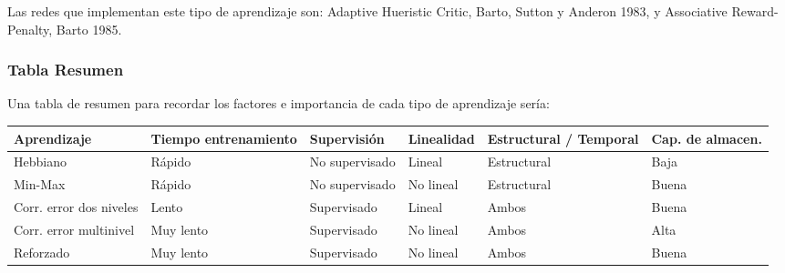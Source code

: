 Las redes que implementan este tipo de aprendizaje son: Adaptive Hueristic
Critic, Barto, Sutton y Anderon 1983, y Associative Reward-Penalty, Barto 1985.

\subsubsection{Tabla Resumen}

Una tabla de resumen para recordar los factores e importancia de cada tipo de aprendizaje sería:

\begin{tabularx}{\textwidth}{|X|X|X|X|X|X|}
	\hline 
	Aprendizaje	& Tiempo entrenamiento	& Supervisión			& Linealidad	& Estructural / Temporal	& Cap. de almacen. \\
	\hline 
	Hebbiano 	& Rápido		& No supervisado		& Lineal	& Estructural			& Baja	\\
	Min-Max		& Rápido		& No supervisado		& No lineal	& Estructural			& Buena	\\
	Corr. error dos niveles & Lento		& Supervisado			& Lineal	& Ambos				& Buena	\\
	Corr. error multinivel & Muy lento	& Supervisado			& No lineal	& Ambos				& Alta	\\
	Reforzado	& Muy lento		& Supervisado			& No lineal	& Ambos				& Buena \\
	\hline 	
\end{tabularx}


%
%
%
%
%

